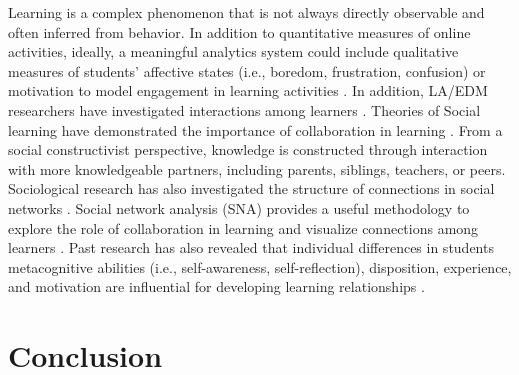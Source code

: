 \documentclass[sigconf]{acmart}
\begin{document}
Learning is a complex phenomenon that is not always directly observable and 
often inferred from behavior. In addition to quantitative measures of online
activities, ideally, a meaningful analytics system could include qualitative
measures of students' affective states (i.e., boredom, frustration, confusion) 
or motivation to model engagement in learning activities 
\cite{baker14, pardos14}. In addition, LA/EDM researchers have investigated
interactions among learners \cite{dawson14}. Theories of Social learning have 
demonstrated the importance of collaboration in learning \cite{vygotsky78}. 
From a social constructivist perspective, knowledge is constructed through 
interaction with more knowledgeable partners, including parents, siblings, 
teachers, or peers. Sociological research has also investigated the structure 
of connections in social networks \cite{granovetter73}. Social network analysis
(SNA) provides a useful methodology to explore the role of collaboration in 
learning and visualize connections among learners \cite{siemens13}.
Past research has also revealed that individual differences in students
metacognitive abilities (i.e., self-awareness, self-reflection), disposition, 
experience, and motivation are influential for developing learning relationships 
\cite{gasevic15 lang17,lester19, papamitsiou14}. 


\section{Conclusion}
\end{document}
